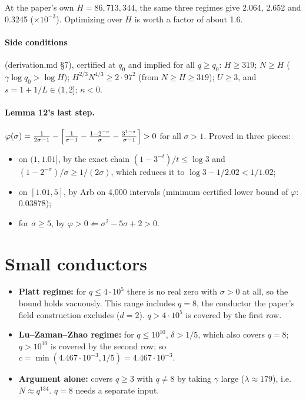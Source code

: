 \documentclass[11pt]{article}
\begin{document}
At the paper's own $H=86{,}713{,}344$, the same three regimes give 2.064, 2.652 and 0.3245 ($\times10^{-3}$). Optimizing over $H$ is worth a factor of about 1.6.

\paragraph{Side conditions} (derivation.md \S7), certified at $q_0$ and implied for all $q\ge q_0$:
$H\ge 319$; $N\ge H$ ($\gamma\log q_0>\log H$); $H^{2/3}N^{4/3}\ge 2\cdot97^2$ (from $N\ge H\ge 319$); $U\ge 3$, and $s=1+1/L\in(1,2]$; $\kappa<0$.

\paragraph{Lemma 12's last step.}
$\varphi(\sigma) = \frac{1}{2\sigma-1} - \Bigl[\frac{1}{\sigma-1} - \frac{1-2^{-\sigma}}{\sigma} - \frac{3^{1-\sigma}}{\sigma-1}\Bigr] > 0$ for all $\sigma>1$. Proved in three pieces:
\begin{itemize}
\item on $(1,1.01]$, by the exact chain $(1-3^{-t})/t\le\log 3$ and $(1-2^{-\sigma})/\sigma\ge 1/(2\sigma)$, which reduces it to $\log 3 - 1/2.02 < 1/1.02$;
\item on $[1.01,5]$, by Arb on 4{,}000 intervals (minimum certified lower bound of $\varphi$: $0.03878$);
\item for $\sigma\ge 5$, by $\varphi>0 \Leftarrow \sigma^2-5\sigma+2>0$.
\end{itemize}

\section{Small conductors}

\begin{itemize}
\item \textbf{Platt regime:} for $q\le 4\cdot10^5$ there is no real zero with $\sigma>0$ at all, so the bound holds vacuously. This range includes $q=8$, the conductor the paper's field construction excludes ($d=2$). $q>4\cdot10^5$ is covered by the first row.
\item \textbf{Lu--Zaman--Zhao regime:} for $q\le10^{10}$, $\delta>1/5$, which also covers $q=8$; $q>10^{10}$ is covered by the second row; so $c=\min(4.467\cdot10^{-3},1/5)=4.467\cdot10^{-3}$.
\item \textbf{Argument alone:} covers $q\ge3$ with $q\ne8$ by taking $\gamma$ large ($\lambda\approx179$), i.e.\ $N\approx q^{134}$. $q=8$ needs a separate input.
\end{itemize}
\end{document}
